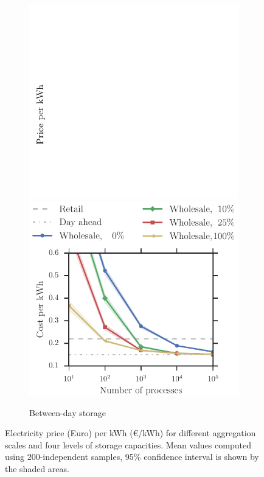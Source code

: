 \documentclass[conference]{IEEEtran}
\begin{document}
\begin{figure}[t!]
\begin{subfigure}[b]{0.32\textwidth}
    	\includegraphics[scale=0.7,clip=true, trim=0.3cm 0.0cm 8.7cm 3cm]{figures/ylabel.pdf}
        \includegraphics[width=1.0\textwidth, clip=true, trim=0.8cm 0 0 2cm]{figures/Wholesale_betweenDay.pdf}
        \caption{Between-day storage}
        \label{fig:wholesale_betweenDay}
    \end{subfigure}
\caption{Electricity price (Euro) per kWh (\euro/kWh) for different aggregation scales and four levels of storage capacities. Mean values computed using $200$-independent samples, 95$\%$ confidence interval is shown by the shaded areas.}
\end{figure}
\end{document}
